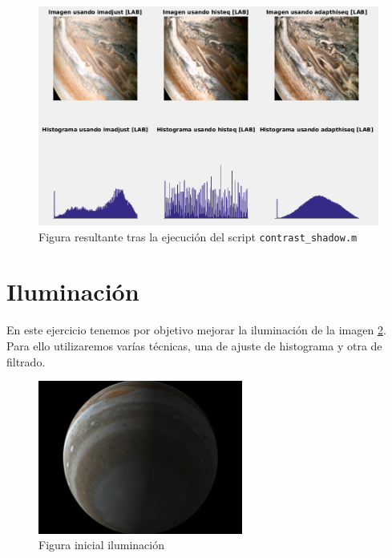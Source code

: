 \documentclass[12pt]{article}
\begin{document}
	\begin{figure}[h]
		\begin{center}
			\includegraphics[width=1\textwidth]{img/contrast_shadow.png}
			\caption{Figura resultante tras la ejecución del script \texttt{contrast\_shadow.m}}
			\label{img: contrast shadow}
		\end{center}
	\end{figure}
	
	
	\pagebreak
	
	\section{Iluminación}
	
	\noindent En este ejercicio tenemos por objetivo mejorar la iluminación de la imagen \ref{img: iluminacion src}. Para ello utilizaremos varías técnicas, una de ajuste de histograma y otra de filtrado.
	
	\begin{figure}[h]
		\begin{center}
			\includegraphics[width=0.6\textwidth]{img/iluminacion.jpg}
			\caption{Figura inicial iluminación}
			\label{img: iluminacion src}
		\end{center}
	\end{figure}
\end{document}
